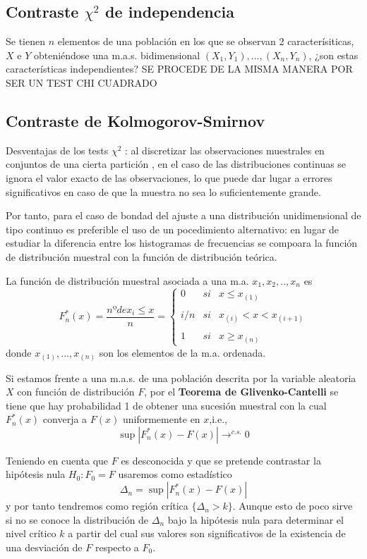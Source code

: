 \documentclass[a4paper,12pt]{article}
\begin{document}
\subsection{Contraste $\chi^2$ de independencia}
Se tienen $n$ elementos de una población en los que se observan 2 caracterísiticas, $X$ e $Y$ obteniéndose una m.a.s. bidimensional $(X_1,Y_1),...,(X_n,Y_n)$, ¿son estas características independientes?
SE PROCEDE DE LA MISMA MANERA POR SER UN TEST CHI CUADRADO

\subsection{Contraste de Kolmogorov-Smirnov }
Desventajas de los tests $\chi^2$ : al discretizar las observaciones muestrales en conjuntos de una cierta partición , en el caso de las distribuciones continuas se ignora el valor exacto de las observaciones, lo que puede dar lugar a errores significativos en caso de que la muestra no sea lo suficientemente grande.

Por tanto, para el caso de bondad del ajuste a una distribución unidimensional de tipo continuo es preferible el uso de un pocedimiento alternativo: en lugar de estudiar la diferencia entre los histogramas de frecuencias se compoara la función de distribución muestral con la función de distribución teórica.

La función de distribución muestral asociada a  una m.a. $x_1, x_2,..,x_n$ es 
$$F^*_n(x) = \frac{nº de x_i \leq x}{n} = \left\{ \begin{array}{lcc}
             0 &   si  & x \leq x_{(1)} \\
             \\ i/n &  si & x_{(i)} < x < x_{(i+1)} \\
             \\ 1 &  si  & x \geq x_{(n)}
             \end{array}
   \right. $$
donde $x_{(1)},...,x_{(n)}$ son los elementos de la m.a. ordenada.

Si estamos frente a una m.a.s. de una población descrita por la variable aleatoria $X$ con función de distribución $F$, por el \textbf{Teorema de Glivenko-Cantelli} se tiene que hay probabilidad 1 de obtener una sucesión muestral con la cual $F^*_n(x)$ converja a $F(x)$ uniformemente en $x$,i.e.,
$$\sup |F^*_n(x) - F(x)| \longrightarrow^{c.s.} 0$$

Teniendo en cuenta que $F$ es desconocida y que se pretende contrastar la hipótesis nula $H_0 : F_0 = F$ usaremos como estadístico
$$\Delta_n = \sup |F^*_n(x) - F(x)|  $$
y por tanto tendremos como región crítica $\{\Delta_n > k\}$. Aunque esto de poco sirve si no se conoce la distribución de $\Delta_n$ bajo la hipótesis nula para determinar el nivel crítico $k$ a partir del cual sus valores son significativos de la existencia de una desviación de $F$ respecto a $F_0$.
\end{document}
